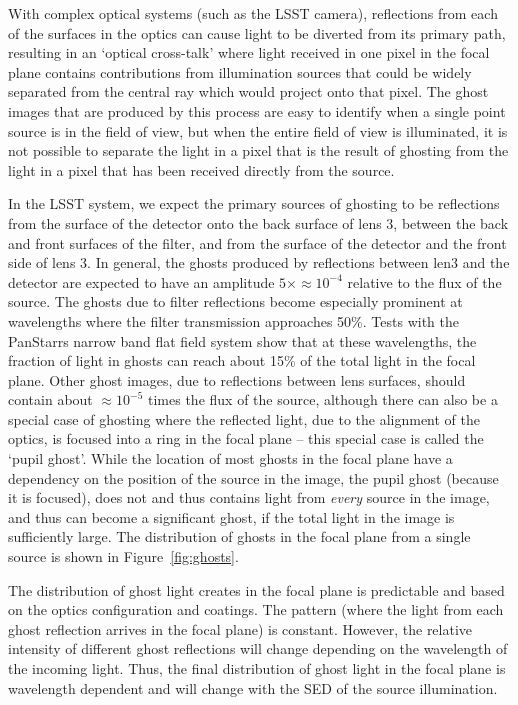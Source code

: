 \documentclass[12pt,preprint]{aastex}
\begin{document}
With complex optical systems (such as the LSST camera), reflections
from each of the surfaces in the optics can cause light to be diverted
from its primary path, resulting in an `optical cross-talk' where
light received in one pixel in the focal plane contains contributions
from illumination sources that could be widely separated from the
central ray which would project onto that pixel.  The ghost images
that are produced by this process are easy to identify when a single
point source is in the field of view, but when the entire field of
view is illuminated, it is not possible to separate the light in a
pixel that is the result of ghosting from the light in a pixel that
has been received directly from the source. 

In the LSST system, we expect the primary sources of ghosting to be
reflections from the surface of the detector onto the back surface of
lens 3, between the back and front surfaces of the filter, and from
the surface of the detector and the front side of lens 3. In general,
the ghosts produced by reflections between len3 and the detector are
expected to have an amplitude $5\times\approx10^{-4}$ relative to the
flux of the source.  The ghosts due to filter reflections become
especially prominent at wavelengths where the filter transmission
approaches 50\%.  Tests with the PanStarrs narrow band flat field
system \citep{Stubbs2010a} show that at these wavelengths, the
fraction of light in ghosts can reach about 15\% of the total light in
the focal plane.  Other ghost images, due to reflections between lens
surfaces, should contain about $\approx10^{-5}$ times the flux of the
source, although there can also be a special case of ghosting where
the reflected light, due to the alignment of the optics, is focused
into a ring in the focal plane -- this special case is called the
`pupil ghost'.  While the location of most ghosts in the focal plane
have a dependency on the position of the source in the image, the
pupil ghost (because it is focused), does not and thus contains light
from {\it every} source in the image, and thus can become a
significant ghost, if the total light in the image is sufficiently
large. The distribution of ghosts in the focal plane from a single
source is shown in Figure~\ref{fig:ghosts}.

The distribution of ghost light creates in the focal plane is
predictable and based on the optics configuration and coatings. The
pattern (where the light from each ghost reflection arrives in the
focal plane) is constant. However, the relative intensity of different
ghost reflections will change depending on the wavelength of the
incoming light. Thus, the final distribution of ghost light in the
focal plane is wavelength dependent and will change with the SED of
the source illumination.
\end{document}

